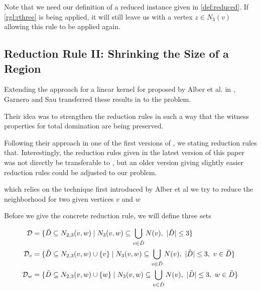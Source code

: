 Note that we need our definition of a reduced instance given in \ref{def:reduced}. If \cref{rgl:rthree} is being applied, it will still leave us with a vertex $z\in N_3(v)$ allowing this rule to be applied again.

\subsection{Reduction Rule II: Shrinking the Size of a Region}


Extending the approach for a linear kernel for \dom proposed by Alber et al. in \cite{Alber2004}, Garnero and Sau transferred these results in \cite{Garnero2018} to the \tdom problem. 

Their idea was to strengthen the reduction rules in such a way that the witness properties for total domination are being preserved.

Following their approach in one of the first versions of \cite{Garnero2014}, we stating reduction rules that. Interestingly, the reduction rules given in the latest version of this paper was not directly be transferable to \sdom, but an older version giving slightly easier reduction rules could be adjusted to our problem.

which relies on the technique first introduced by Alber et al we try to reduce the neighborhood for two given vertices $v$ and $w$

Before we give the concrete reduction rule, we will define three sets 

\begin{align}
    \mathcal{D} & = \{ \tilde D \subseteq N_{2,3}(v,w)            \mid N_3(v,w) \subseteq \bigcup_{v \in \tilde D} N(v),\ |\tilde D| \leq 3                  \} \\
    \mathcal{D}_{v}  & = \{ \tilde D \subseteq N_{2,3}(v,w) \cup \{v\} \mid N_3(v,w) \subseteq \bigcup_{v \in \tilde D} N(v),\ |\tilde D| \leq 3,\ v \in \tilde D \} \\
    \mathcal{D}_{w}  & = \{ \tilde D \subseteq N_{2,3}(v,w) \cup \{w\} \mid N_3(v,w) \subseteq \bigcup_{v \in \tilde D} N(v),\ |\tilde D| \leq 3,\ w \in \tilde D \}
\end{align}



